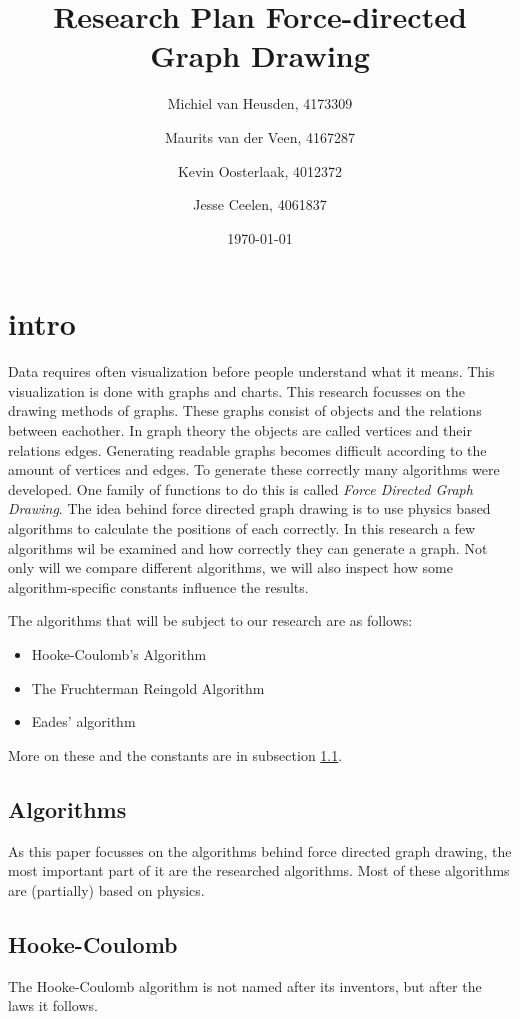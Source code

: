 \documentclass[a4paper,12pt]{article}
\title{Research Plan Force-directed Graph Drawing}
\author{Michiel van Heusden, 4173309 \and Maurits van der Veen, 4167287 \and Kevin Oosterlaak, 4012372 \and Jesse Ceelen, 4061837}
\date{\today}
\begin{document}
  \maketitle
  \tableofcontents
  \section{intro}
  Data requires often visualization before people understand what it means.
  This visualization is done with graphs and charts.
  This research focusses on the drawing methods of graphs.
  These graphs consist of objects and the relations between eachother.
  In graph theory the objects are called vertices and their relations edges.
  Generating readable graphs becomes difficult according to the amount of vertices and edges.
  To generate these correctly many algorithms were developed.
  One family of functions to do this is called \emph{Force Directed Graph Drawing}.
  The idea behind force directed graph drawing is to use physics based algorithms to calculate the positions of each correctly.
  In this research a few algorithms wil be examined and how correctly they can generate a graph.
  Not only will we compare different algorithms, we will also inspect how some algorithm-specific constants influence the results.

  The algorithms that will be subject to our research are as follows:
  \begin{itemize}
    \item Hooke-Coulomb's Algorithm
    \item The Fruchterman Reingold Algorithm
    \item Eades' algorithm
  \end{itemize}
  More on these and the constants are in subsection \ref{par:algorithms}.

  \subsection{Algorithms}\label{par:algorithms}
    As this paper focusses on the algorithms behind force directed graph drawing, the most important part of it are the researched algorithms.
    Most of these algorithms are (partially) based on physics.
    \subsection{Hooke-Coulomb}
    The Hooke-Coulomb algorithm is not named after its inventors, but after the laws it follows.
\end{document}
